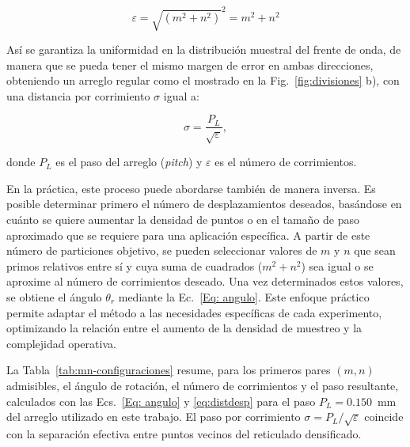 \documentclass[letterpaper,12pt,oneside]{book}
\begin{document}
\begin{equation}
\varepsilon = \sqrt{(m^2+n^2)}^2=m^2+n^2
\end{equation}

Así se garantiza la uniformidad en la distribución muestral del frente de onda, de manera
que se pueda tener el mismo margen de error en ambas direcciones, obteniendo un arreglo
regular como el mostrado en la Fig.~\ref{fig:divisiones} b), con una distancia por
corrimiento $\sigma$ igual a:

\begin{equation}
\sigma=\frac{P_L}{\sqrt{\varepsilon}},
\label{eq:distdesp}
\end{equation}

donde $P_L$ es el paso del arreglo (\textit{pitch}) y $\varepsilon$ es el número de
corrimientos.

En la práctica, este proceso puede abordarse también de manera inversa. Es posible
determinar primero el número de desplazamientos deseados, basándose en cuánto se quiere
aumentar la densidad de puntos o en el tamaño de paso aproximado que se requiere para una
aplicación específica. A partir de este número de particiones objetivo, se pueden
seleccionar valores de $m$ y $n$ que sean primos relativos entre sí y cuya suma de
cuadrados ($m^2 + n^2$) sea igual o se aproxime al número de corrimientos deseado. Una vez
determinados estos valores, se obtiene el ángulo $\theta_r$ mediante la Ec.~\ref{Eq:
angulo}. Este enfoque práctico permite adaptar el método a las necesidades específicas de
cada experimento, optimizando la relación entre el aumento de la densidad de muestreo y la
complejidad operativa.

La Tabla~\ref{tab:mn-configuraciones} resume, para los primeros pares $(m,n)$ admisibles,
el ángulo de rotación, el número de corrimientos y el paso resultante, calculados con las
Ecs.~\ref{Eq: angulo} y \ref{eq:distdesp} para el paso $P_L = 0.150$~mm del arreglo
utilizado en este trabajo. El paso por corrimiento $\sigma = P_L/\sqrt{\varepsilon}$
coincide con la separación efectiva entre puntos vecinos del reticulado densificado.
\end{document}
